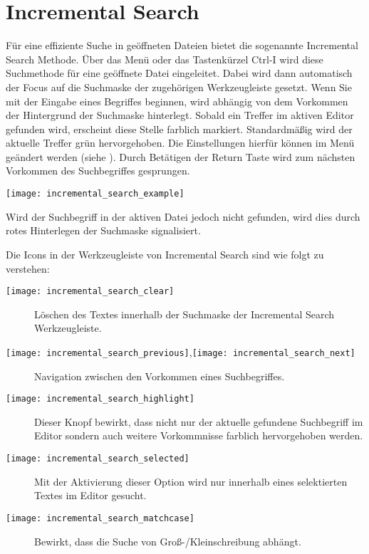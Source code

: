 \section{Incremental Search}

Für eine effiziente Suche in geöffneten Dateien bietet \codeblocks die sogenannte Incremental Search Methode. Über das Menü  oder das Tastenkürzel Ctrl-I wird diese Suchmethode für eine geöffnete Datei eingeleitet. Dabei wird dann automatisch der Focus auf die Suchmaske der zugehörigen Werkzeugleiste gesetzt. Wenn Sie mit der Eingabe eines Begriffes beginnen, wird abhängig von dem Vorkommen der Hintergrund der Suchmaske hinterlegt. Sobald ein Treffer im aktiven Editor gefunden wird, erscheint diese Stelle farblich markiert. Standardmäßig wird der aktuelle Treffer grün hervorgehoben. Die Einstellungen hierfür können im Menü  geändert werden (siehe ). Durch Betätigen der Return Taste wird zum nächsten Vorkommen des Suchbegriffes gesprungen.

\texttt{[image: incremental\_search\_example]}

Wird der Suchbegriff in der aktiven Datei jedoch nicht gefunden, wird dies durch rotes Hinterlegen der Suchmaske signalisiert.

Die Icons in der Werkzeugleiste von Incremental Search sind wie folgt zu verstehen:

\begin{description}
\item[\texttt{[image: incremental\_search\_clear]}] Löschen des Textes innerhalb der Suchmaske der Incremental Search Werkzeugleiste.
\item[\texttt{[image: incremental\_search\_previous]},\texttt{[image: incremental\_search\_next]}] Navigation zwischen den Vorkommen eines Suchbegriffes.
\item[\texttt{[image: incremental\_search\_highlight]}] Dieser Knopf bewirkt, dass nicht nur der aktuelle gefundene Suchbegriff im Editor sondern auch weitere Vorkommnisse farblich hervorgehoben werden.
\item[\texttt{[image: incremental\_search\_selected]}] Mit der Aktivierung dieser Option wird nur innerhalb eines selektierten Textes im Editor gesucht.
\item[\texttt{[image: incremental\_search\_matchcase]}] Bewirkt, dass die Suche von Groß-/Kleinschreibung abhängt.
\end{description}


